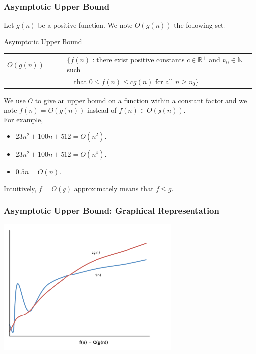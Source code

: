 \documentclass{beamer}
\begin{document}
\begin{frame}%
\frametitle{Asymptotic Upper Bound}

\scriptsize

Let $g(n)$ be a positive function. We note $O(g(n))$ the following set:

\begin{block}{Asymptotic Upper Bound}
\begin{tabular}{lcl}
$O(g(n))$ & $=$ &  $\{ f(n)$ : there exist positive constants $c \in \mathbb{R}^+$ and $n_0 \in \mathbb{N}$ such\\
& & \ \ that $0 \le f(n) \le cg(n)$ for all $n \ge n_0 \}$\\
\end{tabular}
\end{block}

We use $O$ to give an upper bound on a function within a constant factor and we
note $f(n) = O(g(n))$ instead of $f(n) \in O(g(n))$.\\
\vspace{0.3cm}
For example,
\begin{itemize}
\item $23n^2 + 100n + 512 = O(n^2)$.
\item $23n^2 + 100n + 512 = O(n^4)$.
\item $0.5n = O(n)$.
\end{itemize}

\vspace{0.3cm}
Intuitively, $f = O(g)$ approximately means that $f \le g$.

\end{frame}

\begin{frame}[containsverbatim]
\frametitle{Asymptotic Upper Bound: Graphical Representation}

\begin{center}
\includegraphics[width=9cm]{big_O.pdf}%
\end{center}

\end{frame}
\end{document}
